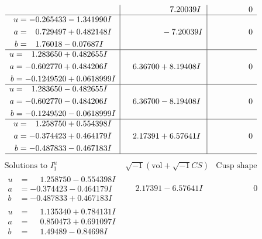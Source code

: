 \documentclass[1p]{elsarticle_modified}
\theoremstyle{definition}
\newcommand{\I}{\sqrt{-1}}
\begin{document}
$$\begin{array}{c|c|c}
 & \phantom{-0.000000 -}7.20039 I & \phantom{-0.000000 } 0 \\ \hline\begin{aligned}
u &= -0.265433 - 1.341990 I \\
a &= \phantom{-}0.729497 + 0.482148 I \\
b &= \phantom{-}1.76018 - 0.07687 I\end{aligned}
 & \phantom{-0.000000 } -7.20039 I & \phantom{-0.000000 } 0 \\ \hline\begin{aligned}
u &= \phantom{-}1.283650 + 0.482655 I \\
a &= -0.602770 + 0.484206 I \\
b &= -0.1249520 + 0.0618999 I\end{aligned}
 & \phantom{-}6.36700 + 8.19408 I & \phantom{-0.000000 } 0 \\ \hline\begin{aligned}
u &= \phantom{-}1.283650 - 0.482655 I \\
a &= -0.602770 - 0.484206 I \\
b &= -0.1249520 - 0.0618999 I\end{aligned}
 & \phantom{-}6.36700 - 8.19408 I & \phantom{-0.000000 } 0 \\ \hline\begin{aligned}
u &= \phantom{-}1.258750 + 0.554398 I \\
a &= -0.374423 + 0.464179 I \\
b &= -0.487833 - 0.467183 I\end{aligned}
 & \phantom{-}2.17391 + 6.57641 I & \phantom{-0.000000 } 0\\
 \hline 
 \end{array}$$\newpage$$\begin{array}{c|c|c}  
\text{Solutions to }I^u_{1}& \I (\text{vol} + \sqrt{-1}CS) & \text{Cusp shape}\\
 \hline 
\begin{aligned}
u &= \phantom{-}1.258750 - 0.554398 I \\
a &= -0.374423 - 0.464179 I \\
b &= -0.487833 + 0.467183 I\end{aligned}
 & \phantom{-}2.17391 - 6.57641 I & \phantom{-0.000000 } 0 \\ \hline\begin{aligned}
u &= \phantom{-}1.135340 + 0.784131 I \\
a &= \phantom{-}0.850473 + 0.691097 I \\
b &= \phantom{-}1.49489 - 0.84698 I\end{aligned}

\end{array}$$
\end{document}

